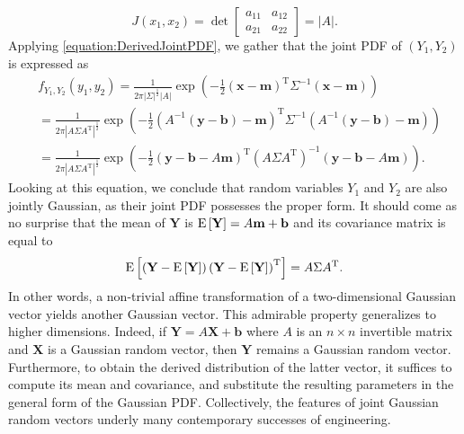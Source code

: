 \begin{example}
\begin{equation*}
J(x_1, x_2)
= \operatorname{det}
\begin{bmatrix} a_{11} & a_{12} \\ a_{21} & a_{22} \end{bmatrix}
= | A | .
\end{equation*}
Applying \eqref{equation:DerivedJointPDF}, we gather that the joint PDF of $(Y_1, Y_2)$ is expressed as
\begin{equation*}
\begin{split}
&f_{Y_1, Y_2} (y_1, y_2)
= \frac{1}{2 \pi |\Sigma|^{\frac{1}{2}} |A|}
\exp \left( - \frac{1}{2}
\left( \mathbf{x} - \mathbf{m} \right)^{\mathrm{T}} \Sigma^{-1} \left( \mathbf{x} - \mathbf{m} \right) \right) \\
&= \frac{1}{2 \pi |A \Sigma A^{\mathrm{T}}|^{\frac{1}{2}}}
\exp \left( - \frac{1}{2}
\left( A^{-1} \left( \mathbf{y} - \mathbf{b} \right) - \mathbf{m} \right)^{\mathrm{T}}
\Sigma^{-1}
\left( A^{-1} \left( \mathbf{y} - \mathbf{b} \right) - \mathbf{m} \right) \right) \\
&= \frac{1}{2 \pi |A \Sigma A^{\mathrm{T}}|^{\frac{1}{2}}}
\exp \left( - \frac{1}{2}
\left( \mathbf{y} - \mathbf{b} - A \mathbf{m} \right)^{\mathrm{T}}
\left( A \Sigma A^{\mathrm{T}} \right)^{-1}
\left( \mathbf{y} - \mathbf{b} - A \mathbf{m} \right) \right) .
\end{split}
\end{equation*}
Looking at this equation, we conclude that random variables $Y_1$ and $Y_2$ are also jointly Gaussian, as their joint PDF possesses the proper form.
It should come as no surprise that the mean of $\mathbf{Y}$ is
$\mathrm{E} \left[ \mathbf{Y} \right] = A \mathbf{m} + \mathbf{b}$
and its covariance matrix is equal to
\begin{equation*}
\mathrm{E} \left[ \left( \mathbf{Y} - \mathrm{E} \left[ \mathbf{Y} \right] \right)
\left( \mathbf{Y} - \mathrm{E} \left[ \mathbf{Y} \right] \right)^{\mathrm{T}} \right]
= A \Sigma A^{\mathrm{T}} .
\end{equation*}
In other words, a non-trivial affine transformation of a two-dimensional Gaussian vector yields another Gaussian vector.
This admirable property generalizes to higher dimensions.
Indeed, if $\mathbf{Y} = A \mathbf{X} + \mathbf{b}$ where $A$ is an $n \times n$ invertible matrix and $\mathbf{X}$ is a Gaussian random vector, then $\mathbf{Y}$ remains a Gaussian random vector.
Furthermore, to obtain the derived distribution of the latter vector, it suffices to compute its mean and covariance, and substitute the resulting parameters in the general form of the Gaussian PDF.
Collectively, the features of joint Gaussian random vectors underly many contemporary successes of engineering.
\end{example}


